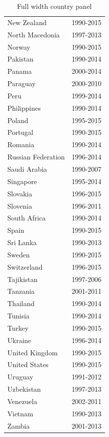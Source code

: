 \documentclass[12pt,a4paper]{article}
\begin{document}
\begin{table}[htbp]
\begin{subtable}{0.45\textwidth}
\begin{tabular}{ll}
               New Zealand &  1990-2015 \\
           North Macedonia &  1997-2013 \\
                    Norway &  1990-2015 \\
                  Pakistan &  1990-2014 \\
                    Panama &  2000-2014 \\
                  Paraguay &  2000-2010 \\
                      Peru &  1999-2014 \\
               Philippines &  1990-2014 \\
                    Poland &  1995-2015 \\
                  Portugal &  1990-2015 \\
                   Romania &  1990-2014 \\
        Russian Federation &  1996-2014 \\
              Saudi Arabia &  1990-2007 \\
                 Singapore &  1995-2014 \\
                  Slovakia &  1996-2015 \\
                  Slovenia &  1996-2011 \\
              South Africa &  1990-2014 \\
                     Spain &  1990-2015 \\
                 Sri Lanka &  1990-2013 \\
                    Sweden &  1990-2015 \\
               Switzerland &  1996-2015 \\
                Tajikistan &  1997-2006 \\
                  Tanzania &  2001-2011 \\
                  Thailand &  1990-2014 \\
                   Tunisia &  1990-2014 \\
                    Turkey &  1990-2015 \\
                   Ukraine &  1996-2014 \\
            United Kingdom &  1990-2015 \\
             United States &  1990-2015 \\
                   Uruguay &  1991-2012 \\
                Uzbekistan &  1997-2013 \\
                 Venezuela &  2002-2011 \\
                   Vietnam &  1990-2013 \\
                    Zambia &  2001-2013 \\
\bottomrule
\end{tabular}
\end{subtable}
\caption{Full width country panel}
\label{tab:all_countries}
\end{table}


\restoregeometry{}
\end{document}
